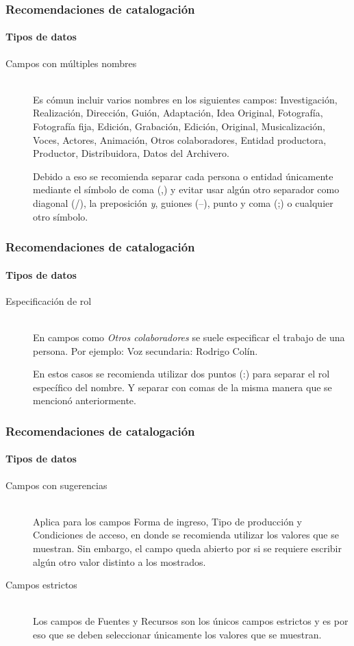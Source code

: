 \documentclass{beamer}
\begin{document}
\begin{frame}
	\frametitle{Recomendaciones de catalogación}
	\framesubtitle{Tipos de datos}
	\begin{description}
		\item[Campos con múltiples nombres] \hfill \\
			Es cómun incluir varios nombres en los siguientes campos: Investigación, Realización, Dirección, Guión, Adaptación, Idea Original, Fotografía, Fotografía fija, Edición, Grabación, Edición, Original, Musicalización, Voces, Actores, Animación, Otros colaboradores, Entidad productora, Productor, Distribuidora, Datos del Archivero.
			
			Debido a eso se recomienda separar cada persona o entidad únicamente mediante el símbolo de coma (,) y evitar usar algún otro separador como diagonal (/), la preposición \textit{y}, guiones (--), punto y coma (;) o cualquier otro símbolo.
	\end{description}
\end{frame}

\begin{frame}
	\frametitle{Recomendaciones de catalogación}
	\framesubtitle{Tipos de datos}
	\begin{description}
		\item[Especificación de rol] \hfill \\
			En campos como \textit{Otros colaboradores} se suele especificar el trabajo de una persona. Por ejemplo: Voz secundaria: Rodrigo Colín.
			
			En estos casos se recomienda utilizar dos puntos (:) para separar el rol específico del nombre. Y separar con comas de la misma manera que se mencionó anteriormente.
	\end{description}
\end{frame}

\begin{frame}
	\frametitle{Recomendaciones de catalogación}
	\framesubtitle{Tipos de datos}
	\begin{description}
		\item[Campos con sugerencias] \hfill \\
			Aplica para los campos Forma de ingreso, Tipo de producción y Condiciones de acceso, en donde se recomienda utilizar los valores que se muestran. Sin embargo, el campo queda abierto por si se requiere escribir algún otro valor distinto a los mostrados.
		\item[Campos estrictos] \hfill \\
			Los campos de Fuentes y Recursos son los únicos campos estrictos y es por eso que se deben seleccionar únicamente los valores que se muestran.
	\end{description}
\end{frame}
\end{document}

